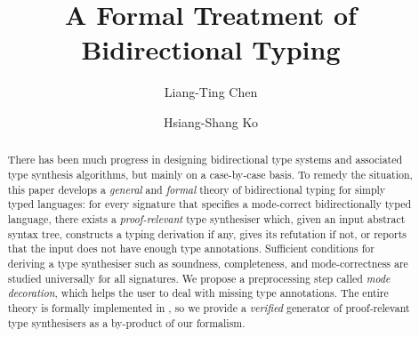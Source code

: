 \documentclass[runningheads,orivec,envcountsect,envcountsame]{llncs}
\author{Liang-Ting Chen\orcidID{0000-0002-3250-1331} \and Hsiang-Shang Ko\orcidID{0000-0002-2439-1048}}
\institute{Institute of Information Science, Academia Sinica, Taipei, Taiwan}
\title{A Formal Treatment of Bidirectional Typing}
\numberwithin{table}{section}
\begin{document}
\maketitle

\begin{abstract}
There has been much progress in designing bidirectional type systems and associated type synthesis algorithms, but mainly on a case-by-case basis.
To remedy the situation, this paper develops a \emph{general} and \emph{formal} theory of bidirectional typing for simply typed languages: for every signature that specifies a mode-correct bidirectionally typed language, there exists a \emph{proof-relevant} type synthesiser which, given an input abstract syntax tree, constructs a typing derivation if any, gives its refutation if not, or reports that the input does not have enough type annotations.
Sufficient conditions for deriving a type synthesiser such as soundness, completeness, and mode-correctness are studied universally for all signatures.
We propose a preprocessing step called \emph{mode decoration}, which helps the user to deal with missing type annotations.
The entire theory is formally implemented in \Agda, so we provide a \emph{verified} generator of proof-relevant type synthesisers as a by-product of our formalism.
\end{abstract}


\newif\ifarxiv 












\appendix

\ifarxiv



\fi
\end{document}
